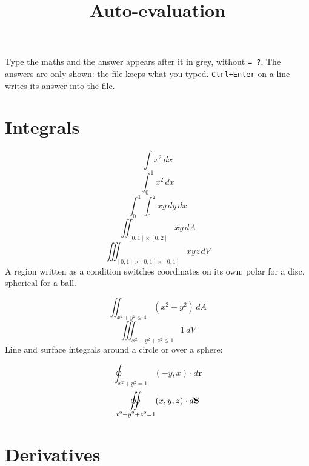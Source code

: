 \documentclass[11pt,a4paper]{article}
\title{Auto-evaluation}
\date{}
\providecommand{\oiint}{\mathop{\oint\mkern-12mu\oint}}
\theoremstyle{plain}
\theoremstyle{definition}
\theoremstyle{remark}
\begin{document}
\maketitle
Type the maths and the answer appears after it in grey, without \texttt{= ?}. The answers are only
shown: the file keeps what you typed. \texttt{Ctrl+Enter} on a line writes its answer into the file.

\section*{Integrals}

\begin{equation*}
  \int x^2 \, dx
\end{equation*}
\begin{equation*}
  \int_0^1 x^2 \, dx
\end{equation*}
\begin{equation*}
  \int_0^1 \int_0^2 x y \, dy \, dx
\end{equation*}
\begin{equation*}
  \iint_{[0, 1] \times [0, 2]} x y \, dA
\end{equation*}
\begin{equation*}
  \iiint_{[0, 1] \times [0, 1] \times [0, 1]} x y z \, dV
\end{equation*}
A region written as a condition switches coordinates on its own: polar for a disc,
spherical for a ball.

\begin{equation*}
  \iint_{x^2 + y^2 \le 4} (x^2 + y^2) \, dA
\end{equation*}
\begin{equation*}
  \iiint_{x^2 + y^2 + z^2 \le 1} 1 \, dV
\end{equation*}
Line and surface integrals around a circle or over a sphere:

\begin{equation*}
  \oint_{x^2 + y^2 = 1} (-y, x) \cdot d\mathbf{r}
\end{equation*}
\begin{equation*}
  \oiint_{x^2 + y^2 + z^2 = 1} (x, y, z) \cdot d\mathbf{S}
\end{equation*}
\section*{Derivatives}
\end{document}
